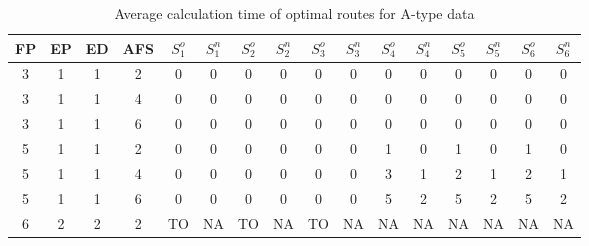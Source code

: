 \begin{longtable}{|c|c|c|c|c c|c c|c c|c c|c c|c c|}
\caption{Average calculation time of optimal routes for A-type data}
\label{tab:avg_time_a} \\
\hline
 FP & EP & ED & AFS & $S^o_1$ & $S^n_1$ & $S^o_2$ & $S^n_2$ & $S^o_3$ & $S^n_3$ & $S^o_4$ & $S^n_4$ & $S^o_5$ & $S^n_5$ & $S^o_6$ & $S^n_6$ \\
\hline\hline
3 & 1 & 1 & 2 & 0 & 0 & 0 & 0 & 0 & 0 & 0 & 0 & 0 & 0 & 0 & 0 \\
\hline
3 & 1 & 1 & 4 & 0 & 0 & 0 & 0 & 0 & 0 & 0 & 0 & 0 & 0 & 0 & 0 \\
\hline
3 & 1 & 1 & 6 & 0 & 0 & 0 & 0 & 0 & 0 & 0 & 0 & 0 & 0 & 0 & 0 \\
\hline
5 & 1 & 1 & 2 & 0 & 0 & 0 & 0 & 0 & 0 & 1 & 0 & 1 & 0 & 1 & 0 \\
\hline
5 & 1 & 1 & 4 & 0 & 0 & 0 & 0 & 0 & 0 & 3 & 1 & 2 & 1 & 2 & 1 \\
\hline
5 & 1 & 1 & 6 & 0 & 0 & 0 & 0 & 0 & 0 & 5 & 2 & 5 & 2 & 5 & 2 \\
\hline
6 & 2 & 2 & 2 & TO & NA & TO & NA & TO & NA & NA & NA & NA & NA & NA & NA \\
\hline
\end{longtable}